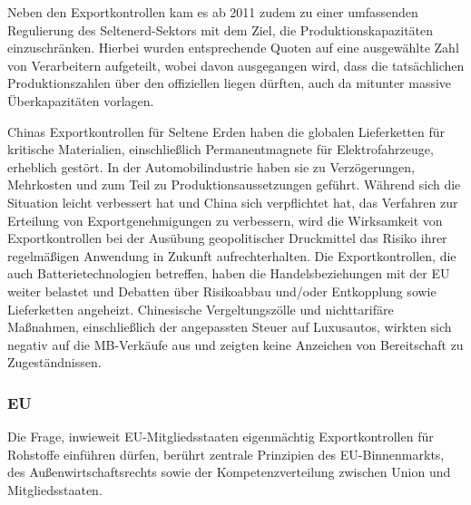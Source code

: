 \documentclass[12pt,a4paper,oneside]{book} %
\begin{document}
Neben den Exportkontrollen kam es ab 2011 zudem zu einer umfassenden Regulierung des Seltenerd-Sektors mit dem Ziel, die Produktionskapazitäten einzuschränken. Hierbei wurden entsprechende Quoten auf eine ausgewählte Zahl von Verarbeitern aufgeteilt, wobei davon ausgegangen wird, dass die tatsächlichen Produktionszahlen über den offiziellen liegen dürften, auch da mitunter massive Überkapazitäten vorlagen.\autocite{Top Commodity News 57, S. 1ff}


Chinas Exportkontrollen für Seltene Erden haben die globalen Lieferketten für kritische Materialien, einschließlich Permanentmagnete für Elektrofahrzeuge, erheblich gestört. In der Automobilindustrie haben sie zu Verzögerungen, Mehrkosten und zum Teil zu Produktionsaussetzungen geführt. Während sich die Situation leicht verbessert hat und China sich verpflichtet hat, das Verfahren zur Erteilung von Exportgenehmigungen zu verbessern, wird die Wirksamkeit von Exportkontrollen bei der Ausübung geopolitischer Druckmittel das Risiko ihrer regelmäßigen Anwendung in Zukunft aufrechterhalten. Die Exportkontrollen, die auch Batterietechnologien betreffen, haben die Handelsbeziehungen mit der EU weiter belastet und Debatten über Risikoabbau und/oder Entkopplung sowie Lieferketten angeheizt. Chinesische Vergeltungszölle und nichttarifäre Maßnahmen, einschließlich der angepassten Steuer auf Luxusautos, wirkten sich negativ auf die MB-Verkäufe aus und zeigten keine Anzeichen von Bereitschaft zu Zugeständnissen.

\subsubsection{EU}

Die Frage, inwieweit EU-Mitgliedsstaaten eigenmächtig Exportkontrollen für Rohstoffe einführen dürfen, berührt zentrale Prinzipien des EU-Binnenmarkts, des Außenwirtschaftsrechts sowie der Kompetenzverteilung zwischen Union und Mitgliedsstaaten.
\end{document}
